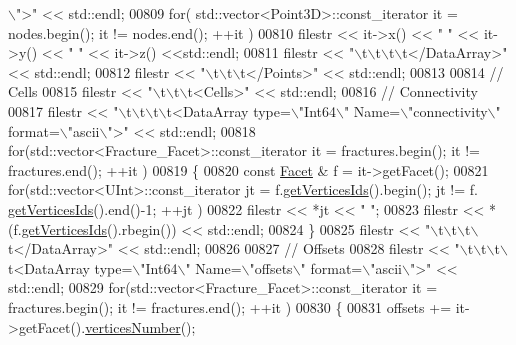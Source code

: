 \begin{DoxyCode}
{      \(\backslash\)">"} << std::endl;
00809     \textcolor{keywordflow}{for}( std::vector<Point3D>::const\_iterator it = nodes.begin(); it != nodes.end(); ++it )
00810         filestr << it->x() << \textcolor{stringliteral}{" "} << it->y() << \textcolor{stringliteral}{" "} << it->z() <<std::endl;
00811     filestr << \textcolor{stringliteral}{"\(\backslash\)t\(\backslash\)t\(\backslash\)t\(\backslash\)t</DataArray>"} << std::endl;
00812     filestr << \textcolor{stringliteral}{"\(\backslash\)t\(\backslash\)t\(\backslash\)t</Points>"} << std::endl;
00813 
00814     \textcolor{comment}{// Cells}
00815     filestr << \textcolor{stringliteral}{"\(\backslash\)t\(\backslash\)t\(\backslash\)t<Cells>"} << std::endl;
00816     \textcolor{comment}{//  Connectivity}
00817     filestr << \textcolor{stringliteral}{"\(\backslash\)t\(\backslash\)t\(\backslash\)t\(\backslash\)t<DataArray type=\(\backslash\)"Int64\(\backslash\)" Name=\(\backslash\)"connectivity\(\backslash\)" format=\(\backslash\)"ascii\(\backslash\)">"} << std::endl;
00818     \textcolor{keywordflow}{for}(std::vector<Fracture\_Facet>::const\_iterator it = fractures.begin(); it != fractures.end(); ++it )
00819     \{
00820         \textcolor{keyword}{const} \hyperlink{classFVCode3D_1_1Rigid__Mesh_1_1Facet}{Facet} & f = it->getFacet();
00821         \textcolor{keywordflow}{for}(std::vector<UInt>::const\_iterator jt = f.\hyperlink{classFVCode3D_1_1Rigid__Mesh_1_1Facet_af92ad0b6b79c69f6c04584301b8998a7}{getVerticesIds}().begin(); jt != f.
      \hyperlink{classFVCode3D_1_1Rigid__Mesh_1_1Facet_af92ad0b6b79c69f6c04584301b8998a7}{getVerticesIds}().end()-1; ++jt )
00822             filestr << *jt << \textcolor{stringliteral}{" "};
00823         filestr << *(f.\hyperlink{classFVCode3D_1_1Rigid__Mesh_1_1Facet_af92ad0b6b79c69f6c04584301b8998a7}{getVerticesIds}().rbegin()) << std::endl;
00824     \}
00825     filestr << \textcolor{stringliteral}{"\(\backslash\)t\(\backslash\)t\(\backslash\)t\(\backslash\)t</DataArray>"} << std::endl;
00826 
00827     \textcolor{comment}{//  Offsets}
00828     filestr << \textcolor{stringliteral}{"\(\backslash\)t\(\backslash\)t\(\backslash\)t\(\backslash\)t<DataArray type=\(\backslash\)"Int64\(\backslash\)" Name=\(\backslash\)"offsets\(\backslash\)" format=\(\backslash\)"ascii\(\backslash\)">"} << std::endl;
00829     \textcolor{keywordflow}{for}(std::vector<Fracture\_Facet>::const\_iterator it = fractures.begin(); it != fractures.end(); ++it )
00830     \{
00831         offsets += it->getFacet().\hyperlink{classFVCode3D_1_1Rigid__Mesh_1_1Facet_a5d18db39a0eeb85e6a4afc2b09813201}{verticesNumber}();

\end{DoxyCode}

